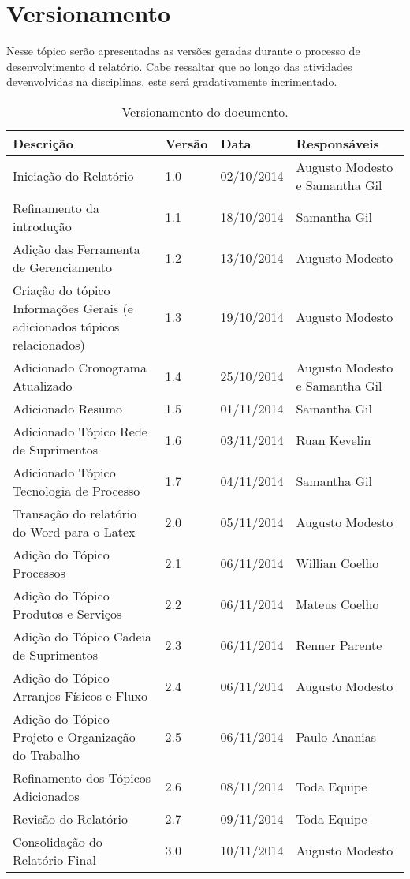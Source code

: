 \chapter[Versionamento]{Versionamento}
\label{chap:versionamento}
	Nesse tópico serão apresentadas as versões geradas durante o processo de desenvolvimento d relatório. Cabe ressaltar que ao longo das atividades devenvolvidas na disciplinas, este será gradativamente incrimentado.
	
	\label{subsubsec:versionamento_talbe}
		\begin{table}[h]
			\centering
			\begin{tabular}{|p{6cm}|p{1.5cm}|p{2.5cm}|p{4cm}|}
				
				\hline
				
				Descrição & Versão & Data & Responsáveis \\ \hline
				Iniciação do Relatório & 1.0 & 02/10/2014 & Augusto Modesto e Samantha Gil \\ \hline
				Refinamento da introdução & 1.1 & 18/10/2014 & Samantha Gil \\ \hline
				Adição das Ferramenta de Gerenciamento & 1.2 & 13/10/2014 & Augusto Modesto \\ \hline
				Criação do tópico Informações Gerais (e adicionados tópicos relacionados) & 1.3 & 19/10/2014 & Augusto Modesto \\ \hline
				Adicionado Cronograma Atualizado & 1.4 & 25/10/2014 & Augusto Modesto e Samantha Gil \\ \hline
				Adicionado Resumo & 1.5 & 01/11/2014 & Samantha Gil \\ \hline
				Adicionado Tópico Rede de Suprimentos & 1.6 & 03/11/2014 & Ruan Kevelin \\ \hline
				Adicionado Tópico Tecnologia de Processo & 1.7 & 04/11/2014 & Samantha Gil \\ \hline
				Transação do relatório do Word para o Latex & 2.0 & 05/11/2014 & Augusto Modesto \\ \hline
				Adição do Tópico Processos & 2.1 & 06/11/2014 & Willian Coelho \\ \hline
				Adição do Tópico Produtos e Serviços & 2.2 & 06/11/2014 & Mateus Coelho \\ \hline
				Adição do Tópico Cadeia de Suprimentos & 2.3 & 06/11/2014 & Renner Parente \\ \hline
				Adição do Tópico Arranjos Físicos e Fluxo & 2.4 & 06/11/2014 & Augusto Modesto \\ \hline
				Adição do Tópico Projeto e Organização do Trabalho & 2.5 & 06/11/2014 & Paulo Ananias \\ \hline
				Refinamento dos Tópicos Adicionados & 2.6 & 08/11/2014 & Toda Equipe \\ \hline
				Revisão do Relatório & 2.7 & 09/11/2014 & Toda Equipe \\ \hline
				Consolidação do Relatório Final & 3.0 & 10/11/2014 & Augusto Modesto \\ \hline				

			\end{tabular}
			\caption[Versionamento do Documento]{Versionamento do documento.}
			\label{tab:versionamento_tabl}
		\end{table}
